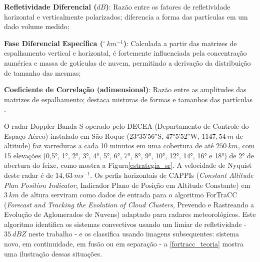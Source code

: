 \begin{alineas}
	\item \textbf{Refletividade Diferencial ($dB$)}: Razão entre os fatores de refletividade horizontal e verticalmente polarizados; diferencia a forma das partículas em um dado volume medido;
	\item \textbf{Fase Diferencial Específica ($^\circ\:km^{-1}$)}: Calculada a partir das matrizes de espalhamento vertical e horizontal, é fortemente influenciada pela concentração numérica e massa de gotículas de nuvem, permitindo a derivação da distribuição de tamanho das mesmas;
	\item \textbf{Coeficiente de Correlação (adimensional)}: Razão entre as amplitudes das matrizes de espalhamento; destaca misturas de formas e tamanhos das partículas \cite{Rauber2018}.
\end{alineas}

O radar Doppler Banda-S operado pelo DECEA (Departamento de Controle do Espaço Aéreo) instalado em São Roque (\ang{23;35;56}\:S, \ang{47;5;52}\:W, $1147,54\:m$ de altitude) faz varreduras a cada 10 minutos em uma cobertura de até $250\:km$, com 15 elevações (\ang{0,5}, \ang{1}, \ang{2}, \ang{3}, \ang{4}, \ang{5}, \ang{6}, \ang{7}, \ang{8}, \ang{9}, \ang{10}, \ang{12}, \ang{14}, \ang{16} e \ang{18}) de \ang{2} de abertura do feixe, como mostra a Figura\autoref{estrategia_sr}. A velocidade de Nyquist deste radar é de $14,63\:ms^{-1}$. Os perfis horizontais de CAPPIs (\textit{Constant Altitude Plan Position Indicator}, Indicador Plano de Posição em Altitude Constante) em $3\:km$ de altura serviram como dados de entrada para o algoritmo ForTraCC (\textit{Forecast and Tracking the Evolution of Cloud Clusters}, Prevendo e Rastreando a Evolução de Aglomerados de Nuvens) \cite{Vila2008} adaptado para radares meteorológicos. Este algoritmo identifica os sistemas convectivos usando um limiar de refletividade - $35\:dBZ$ neste trabalho - e os classifica usando imagens subsequentes: sistema novo, em continuidade, em fusão ou em separação - a \autoref{fortracc_teoria} mostra uma ilustração dessas situações.

